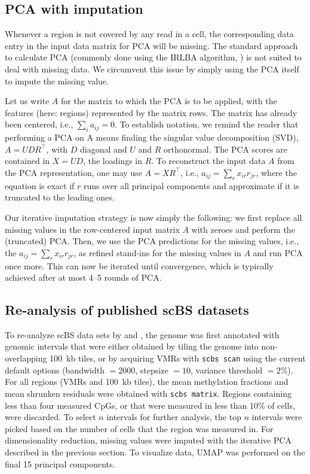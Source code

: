 \documentclass[twocolumn,10pt]{article}
\begin{document}
\subsection{PCA with imputation}

Whenever a region is not covered by any read in a cell, the corresponding data entry in the input data matrix for PCA will be missing. The standard approach to calculate PCA (commonly done using the IRLBA algorithm, \citep{Baglama2005}) is not suited to deal with missing data. We circumvent this issue by simply using the PCA itself to impute the missing value.

Let us write $A$ for the matrix to which the PCA is to be applied, with the features (here: regions) represented by the matrix rows. The matrix has already been centered, i.e., $\sum_i a_{ij}=0$. To establish notation, we remind the reader that performing a PCA on A means finding the singular value decomposition (SVD), $A=UDR^\top$, with $D$ diagonal and $U$ and $R$ orthonormal. The PCA scores are contained in $X=UD$, the loadings in $R$. To reconstruct the input data $A$ from the PCA representation, one may use $A=XR^\top$, i.e., $a_{ij}=\sum_r x_{ir} r_{jr}$, where the equation is exact if $r$ runs over all principal components and approximate if it is truncated to the leading ones.

Our iterative imputation strategy is now simply the following: we first replace all missing values in the row-centered input matrix $A$ with zeroes and perform the (truncated) PCA. Then, we use the PCA predictions for the missing values, i.e., the $a_{ij}=\sum_r x_{ir} r_{jr}$, as refined stand-ins for the missing values in $A$ and run PCA once more. This can now be iterated until convergence, which is typically achieved after at most 4--5 rounds of PCA.

\subsection{Re-analysis of published scBS datasets}
To re-analyze scBS data sets by \citet{luo2017single} and \citet{argelaguet2019gastru}, the genome was first annotated with genomic intervals that were either obtained by tiling the genome into non-overlapping 100~kb tiles, or by acquiring VMRs with \texttt{scbs scan} using the current default options (bandwidth $=2000$, stepsize $=10$, variance threshold $= 2\%$). For all regions (VMRs and 100~kb tiles), the mean methylation fractions and mean shrunken residuals were obtained with \texttt{scbs matrix}. Regions containing less than four measured CpGs, or that were measured in less than 10\% of cells, were discarded. To select $n$ intervals for further analysis, the top $n$ intervals were picked based on the number of cells that the region was measured in. 
For dimensionality reduction, missing values were imputed with the iterative PCA described in the previous section. To visualize data, UMAP was performed on the final 15 principal components.
\end{document}
